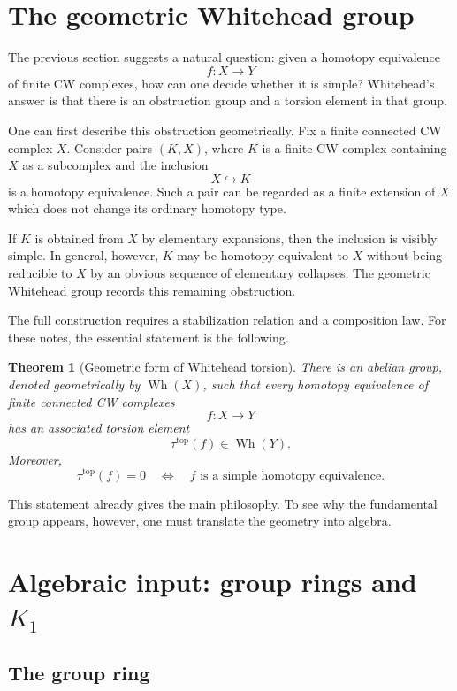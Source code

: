 \documentclass[11pt,a4paper]{article}
\newcommand{\Wh}{\operatorname{Wh}}
\theoremstyle{definition}
\theoremstyle{plain}
\newtheorem{theorem}[definition]{Theorem}
\theoremstyle{remark}
\begin{document}
\section{The geometric Whitehead group}

The previous section suggests a natural question: given a homotopy equivalence
\[
  f:X\longrightarrow Y
\]
of finite CW complexes, how can one decide whether it is simple? Whitehead's answer is that there is an obstruction group and a torsion element in that group.

One can first describe this obstruction geometrically. Fix a finite connected CW complex \(X\). Consider pairs \((K,X)\), where \(K\) is a finite CW complex containing \(X\) as a subcomplex and the inclusion
\[
  X\hookrightarrow K
\]
is a homotopy equivalence. Such a pair can be regarded as a finite extension of \(X\) which does not change its ordinary homotopy type.

If \(K\) is obtained from \(X\) by elementary expansions, then the inclusion is visibly simple. In general, however, \(K\) may be homotopy equivalent to \(X\) without being reducible to \(X\) by an obvious sequence of elementary collapses. The geometric Whitehead group records this remaining obstruction.

The full construction requires a stabilization relation and a composition law. For these notes, the essential statement is the following.

\begin{theorem}[Geometric form of Whitehead torsion]
There is an abelian group, denoted geometrically by \(\Wh(X)\), such that every homotopy equivalence of finite connected CW complexes
\[
  f:X\longrightarrow Y
\]
has an associated torsion element
\[
  \tau^{\operatorname{top}}(f)\in \Wh(Y).
\]
Moreover,
\[
  \tau^{\operatorname{top}}(f)=0
  \quad\Longleftrightarrow\quad
  f \text{ is a simple homotopy equivalence}.
\]
\end{theorem}

This statement already gives the main philosophy. To see why the fundamental group appears, however, one must translate the geometry into algebra.

\section{Algebraic input: group rings and \texorpdfstring{\(K_1\)}{K1}}

\subsection{The group ring}
\end{document}
